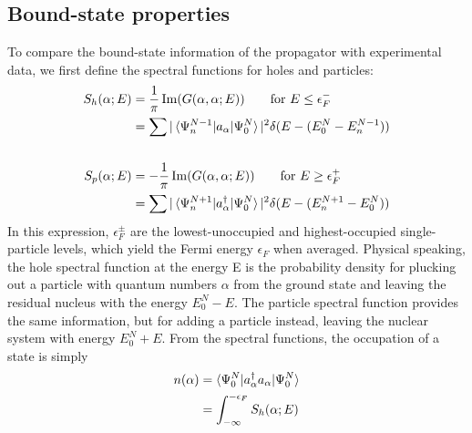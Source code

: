 \subsection{Bound-state properties}
To compare the bound-state information of the propagator with experimental data, we first
define the spectral functions for holes and particles:
\begin{equation}
    \begin{split}
        S_{h}(\alpha; E) & =
        \frac{1}{\pi}\operatorname{Im}({G(\alpha,\alpha;E)})\qquad \text{for } E\leq\epsilon_{F}^{-}\\
        & = \sum|\braket{\Psi^{N-1}_{n}|a_{\alpha}|\Psi^{N}_{0}}|^{2}
        \delta(E-(E^{N}_{0}-E_{n}^{N-1}))\\
        \\
        S_{p}(\alpha; E) & =
        -\frac{1}{\pi}\operatorname{Im}({G(\alpha,\alpha;E)})\qquad \text{for } E\geq\epsilon_{F}^{+}\\
        & = \sum|\braket{\Psi^{N+1}_{n}|a_{\alpha}^{\dagger}|\Psi^{N}_{0}}|^{2}
        \delta(E-(E_{n}^{N+1}-E^{N}_{0}))
    \end{split}
\end{equation}
\noindent
In this expression, $\epsilon_{F}^{\pm}$ are the lowest-unoccupied and highest-occupied
single-particle levels, which yield the Fermi energy $\epsilon_{F}$ when averaged. Physical
speaking, the hole spectral function at the energy E is the probability density for plucking out
a particle with quantum numbers $\alpha$ from the ground state and leaving the residual nucleus with the
energy $E^{N}_{0}-E$. The particle spectral function provides the same information, but for adding a
particle instead, leaving the nuclear system with energy $E^{N}_{0}+E$. From the spectral functions, the occupation of a state is simply
\begin{equation} \label{ParticleNumber}
    \begin{split}
        n(\alpha) & = \braket{\Psi^{N}_{0}|a_{\alpha}^{\dagger}a_{\alpha}|\Psi^{N}_{0}}\\
        & = \int_{-\infty}^{-\epsilon_{F}}S_{h}(\alpha; E)
    \end{split}
\end{equation}

